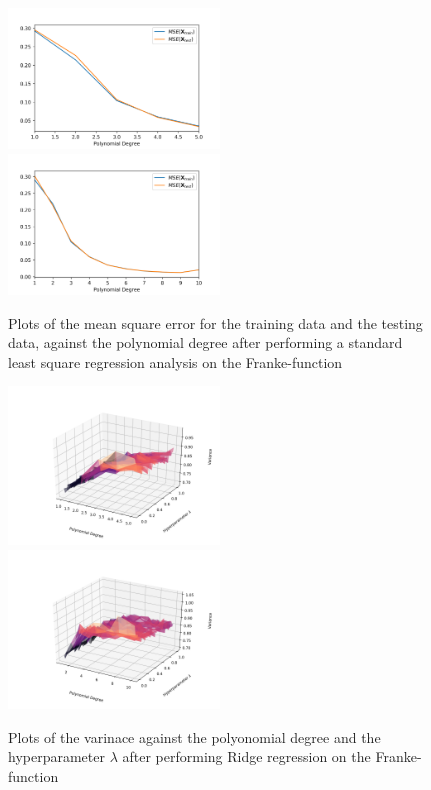 \documentclass[a4paper,10pt,english]{article}
\begin{document}
\begin{figure}[H]
	\centering 
	\includegraphics[width = 0.5\textwidth, center]{../franke_output/part_C_2.png}
	\includegraphics[width = 0.5\textwidth, center]{../franke_output/part_C_2_highdeg.png}
	\caption{
		Plots of the mean square error for the training data and the testing data, against the polynomial degree after performing a standard least square regression analysis on the Franke-function
	}
	\label{part_c2}
\end{figure}





\begin{figure}[H]
	\centering 
	\includegraphics[width = 0.5\textwidth, center]{../franke_output/part_D_1.png}
	\includegraphics[width = 0.5\textwidth, center]{../franke_output/part_D_1_highdeg.png}
	\caption{
		Plots of the varinace against the polyonomial degree and the hyperparameter $\lambda$ after performing Ridge regression on the Franke-function
	}
	\label{part_d1}
\end{figure}
\end{document}
